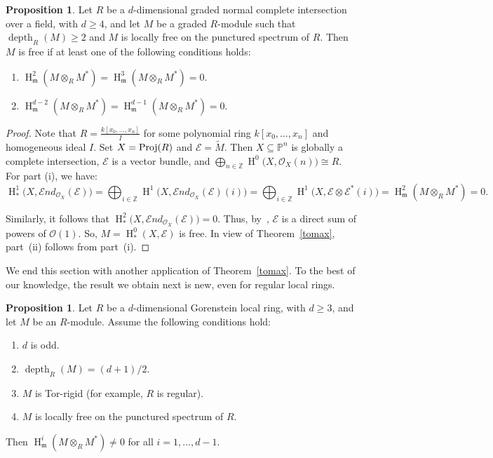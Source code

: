 \documentclass[11pt]{amsart}
\theoremstyle{definition}
\newtheorem{prop}[thm]{Proposition}
\theoremstyle{definition}
\numberwithin{equation}{section}
\newcommand{\fm}{\mathfrak{m}}
\DeclareMathOperator{\depth}{depth}
\DeclareMathOperator{\hh}{H}
\begin{document}
\begin{prop}\label{t3.1} Let $R$ be a $d$-dimensional graded normal complete intersection over a field, with $d\geq 4$, and let $M$ be a graded $R$-module such that $\depth_R(M)\geq 2$ and $M$ is locally free on the punctured spectrum of $R$. Then $M$ is free if at least one of the following conditions holds:
\begin{enumerate}[\rm(i)]
\item $\hh^2_{\fm}(M\otimes_RM^{\ast})=\hh^3_{\fm}(M\otimes_RM^{\ast})=0$.
\item $\hh^{d-2}_{\fm}(M\otimes_RM^{\ast})=\hh^{d-1}_{\fm}(M\otimes_RM^{\ast})=0$.
\end{enumerate}
\end{prop}

\begin{proof} Note that $\displaystyle{R=\frac{k[x_0,\ldots, x_n]}{I}}$ for some polynomial ring $k[x_0,\ldots, x_n]$ and homogeneous ideal $I$. Set $X= \textmd{Proj}(R)$ and $\mathcal{E}=\widetilde{M}$. Then $X\subseteq \mathbb{P}^n$ is globally a complete intersection, $\mathcal{E}$ is  a vector bundle, and $\bigoplus_{n\in \mathbb{Z}} \hh^0\big(X,\mathcal{O}_X(n)\big)\cong R$. For part (i), we have:
$$\hh^1_\ast\big(X,\mathcal{E}nd_{\mathcal{O}_X}(\mathcal{\mathcal{E}})\big)=\bigoplus_{i\in\mathbb{Z}}\hh^1\big(X,\mathcal{E}nd_{\mathcal{O}_X}(\mathcal{\mathcal{E}})(i)\big)=\bigoplus_{i\in\mathbb{Z}}\hh^1\big(X,\mathcal{\mathcal{E}}\otimes \mathcal{\mathcal{\mathcal{E}}}^\ast(i)\big) =\hh^2_{\fm}(M\otimes_RM^*)=0.$$ 

Similarly, it follows that $\hh^2_\ast\big(X,\mathcal{E}nd_{\mathcal{O}_X}(\mathcal{\mathcal{E}})\big)=0$. Thus, by~\cite[1.2]{KC}, $\mathcal{E}$ is a direct sum of powers of $\mathcal{O}(1)$. So, $M= \hh^0_\ast(X, \mathcal{E})$ is free. In view of Theorem~\ref{tomax}, part~(ii) follows from part~(i).
\end{proof}

We end this section with another application of Theorem~\ref{tomax}. To the best of our knowledge, the result we obtain next is new, even for regular local rings.

\begin{prop}\label{cortomax} Let $R$ be a $d$-dimensional Gorenstein local ring, with $d\geq3$, and let $M$ be an $R$-module. Assume the following conditions hold:
\begin{enumerate}[\rm(i)]
\item $d$ is odd.
\item $\depth_R(M)=(d+1)/2$.
\item $M$ is Tor-rigid (for example, $R$ is regular).
\item $M$ is locally free on the punctured spectrum of $R$.
\end{enumerate}
Then $\hh^i_{\fm}(M\otimes_RM^*)\neq 0$ for all $i=1, \ldots, d-1$.  
\end{prop}
\end{document}
